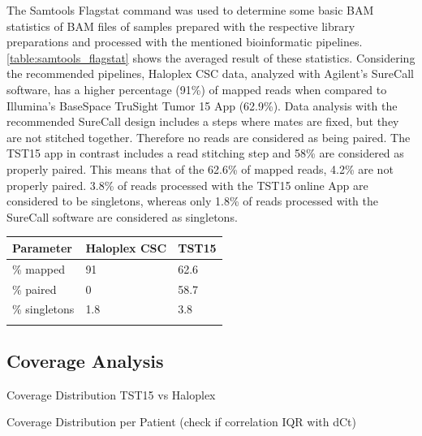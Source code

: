 \begin{minipage}{0.5\textwidth}
The Samtools Flagstat command was used to determine some basic BAM statistics of BAM
files of samples prepared with the respective library preparations and processed with
the mentioned bioinformatic pipelines. \ref{table:samtools_flagstat} shows the
averaged result of these statistics. Considering the recommended pipelines, Haloplex
CSC data, analyzed with Agilent's SureCall software, has a higher percentage (91\%) of mapped
reads when compared to Illumina's BaseSpace TruSight Tumor 15 App (62.9\%). Data analysis
with the recommended SureCall design includes a steps where mates are fixed, but they
are not stitched together. Therefore no reads are considered as being paired. The TST15 app
in contrast includes a read stitching step and 58\% are considered as properly paired.
This means that of the 62.6\% of mapped reads, 4.2\% are not properly paired. 3.8\%
of reads processed with the TST15 online App are considered to be singletons, whereas
only 1.8\% of reads processed with the SureCall software are considered as singletons.
\end{minipage}
\hfill
\begin{minipage}{0.5\textwidth}
\begin{tabular}{p{3cm} p{1.5cm} p{1.5cm}}\\
\hline
Parameter & Haloplex CSC & TST15 \\
\hline
\% mapped & 91 & 62.6 \\
\% paired & 0 & 58.7 \\
\% singletons & 1.8 & 3.8 \\
\label{samtools_flagstat}
\end{tabular}
\end{minipage}

\subsection{Coverage Analysis}

Coverage Distribution TST15 vs Haloplex

Coverage Distribution per Patient (check if correlation IQR with dCt)

